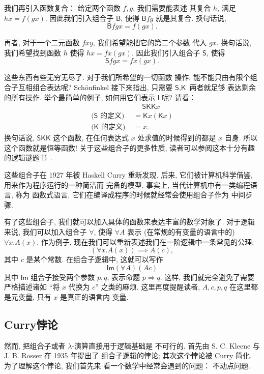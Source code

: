 \documentclass[UTF8]{ctexbook}
\newcommand{\cons}[1]{\textsf{#1}}
\theoremstyle{plain}
\theoremstyle{definition}
\theoremstyle{remark}
\begin{document}
我们再引入函数复合： 给定两个函数 \(f, g\), 我们需要能表述
其复合 \(h\), 满足 \(hx = f(gx)\). 因此我们引入组合子 \(\cons{B}\),
使得 \(\cons{B}fg\) 就是其复合. 换句话说,
\[\cons{B}fgx = f(gx).\]

再者, 对于一个二元函数 \(fxy\), 我们希望能把它的第二个参数
代入 \(gx\). 换句话说, 我们希望找到函数 \(h\)
使得 \(hx = fx(gx)\). 因此我们引入组合子 \(\cons{S}\),
使得 \[\cons{S}fgx = fx(gx).\]

这些东西有些无穷无尽了. 对于我们所希望的一切函数
操作, 能不能只由有限个组合子互相组合表达呢? Sch\"onfinkel
接下来指出, 只需要 \(\cons{S}, \cons{K}\) 两者就足够
表达剩余的所有操作. 举个最简单的例子, 如何用它们表示 \(\cons{I}\)
呢? 请看：
\[\begin{aligned}
  &\quad~\cons{S}\cons{K}\cons{K}x\\
\text{(\(\cons{S}\) 的定义) }&= \cons{K}x(\cons{K}x)\\
\text{(\(\cons{K}\) 的定义) }&= x.
\end{aligned}\]
换句话说, \(\cons{S}\cons{K}\cons{K}\) 这个函数,
在任何表达式 \(x\) 处求值的时候得到的都是 \(x\) 自身.
所以这个函数就是恒等函数! 关于这些组合子的更多性质,
读者可以参阅这本十分有趣的逻辑谜题书~\cite{schonfinkel:1924:combinator}.

这些组合子在 1927 年被 Haskell Curry 重新发现.
后来, 它们被计算机科学借鉴, 用来作为程序运行的一种简洁而
完备的模型. 事实上, 当代计算机中有一类编程语言, 称为
函数式语言, 它们在编译成程序的时候就经常会使用组合子作为
中间步骤.

有了这些组合子, 我们就可以加入具体的函数来表达丰富的数学对象了.
对于逻辑来说, 我们可以加入组合子 \(\forall\), 使得
\(\forall A\) 表示 (在常规的有变量的语言中的) \(\forall x. A(x)\).
作为例子, 现在我们可以重新表述我们在一阶逻辑中一条常见的公理:
\[(\forall x. A(x)) \implies A(c),\]
其中 \(c\) 是某个常数. 在组合子逻辑中, 这就可以写作
\[\cons{Im}(\forall A)(A c)\]
其中 \(\cons{Im}\) 组合子接受两个参数 \(p, q\), 表示命题
\(p \Rightarrow q\). 这样, 我们就完全避免了需要严格描述诸如
“将 \(x\) 代换为 \(c\)” 之类的麻烦. 这里再度提醒读者,
\(A, c, p, q\) 在这里都是元变量, 只有 \(x\) 是真正的语言内
变量.

\subsection{Curry悖论}
然而, 把组合子或者 \(\lambda\)-演算直接用于逻辑基础是
不可行的. 首先由 S. C. Kleene 与 J. B. Rosser 在 1935 年提出了
组合子逻辑的悖论; 其次这个悖论被 Curry 简化. 为了理解这个悖论, 我们首先来
看一个数学中经常会遇到的问题： 不动点问题.
\end{document}
